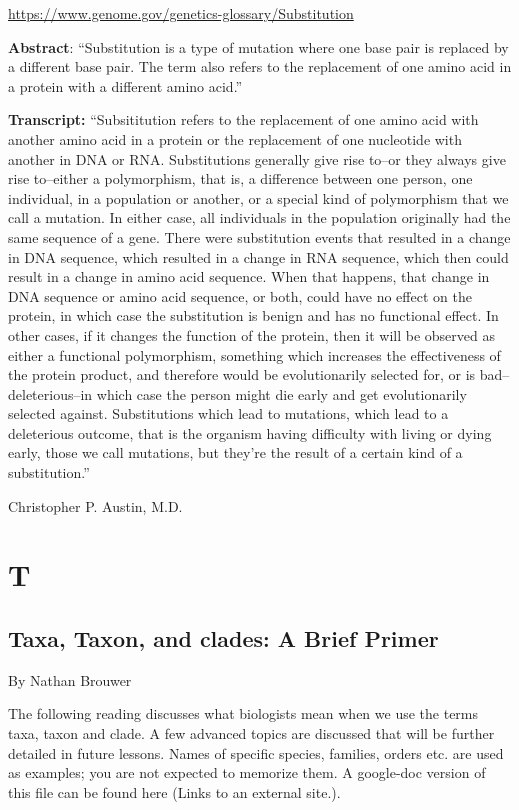 \documentclass[
]{book}
\begin{document}
\url{https://www.genome.gov/genetics-glossary/Substitution}

\textbf{Abstract}: ``Substitution is a type of mutation where one base pair is replaced by a different base pair. The term also refers to the replacement of one amino acid in a protein with a different amino acid.''

\textbf{Transcript:} ``Subsititution refers to the replacement of one amino acid with another amino acid in a protein or the replacement of one nucleotide with another in DNA or RNA. Substitutions generally give rise to--or they always give rise to--either a polymorphism, that is, a difference between one person, one individual, in a population or another, or a special kind of polymorphism that we call a mutation. In either case, all individuals in the population originally had the same sequence of a gene. There were substitution events that resulted in a change in DNA sequence, which resulted in a change in RNA sequence, which then could result in a change in amino acid sequence. When that happens, that change in DNA sequence or amino acid sequence, or both, could have no effect on the protein, in which case the substitution is benign and has no functional effect. In other cases, if it changes the function of the protein, then it will be observed as either a functional polymorphism, something which increases the effectiveness of the protein product, and therefore would be evolutionarily selected for, or is bad--deleterious--in which case the person might die early and get evolutionarily selected against. Substitutions which lead to mutations, which lead to a deleterious outcome, that is the organism having difficulty with living or dying early, those we call mutations, but they're the result of a certain kind of a substitution.''

Christopher P. Austin, M.D.

\hypertarget{t}{%
\chapter{T}\label{t}}

\hypertarget{taxa-taxon-and-clades-a-brief-primer}{%
\section{Taxa, Taxon, and clades: A Brief Primer}\label{taxa-taxon-and-clades-a-brief-primer}}

By Nathan Brouwer

The following reading discusses what biologists mean when we use the terms taxa, taxon and clade. A few advanced topics are discussed that will be further detailed in future lessons. Names of specific species, families, orders etc. are used as examples; you are not expected to memorize them. A google-doc version of this file can be found here (Links to an external site.).
\end{document}
